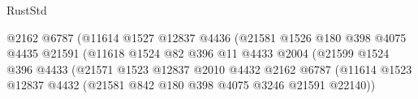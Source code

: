 \begin{lexlean}{RustStd}
\begin{coremodule}
                                                @2162
                                                @6787
                                                (@11614
                                                  @1527
                                                  @12837
                                                  @4436
                                                  (@21581
                                                    @1526
                                                    @180
                                                    @398
                                                    @4075
                                                    @4435
                                                    @21591
                                                    (@11618
                                                      @1524
                                                      @82
                                                      @396
                                                      @11
                                                      @4433
                                                      @2004
                                                      (@21599
                                                        @1524
                                                        @396
                                                        @4433
                                                        (@21571
                                                          @1523
                                                          @12837
                                                          @2010
                                                          @4432
                                                          @2162
                                                          @6787
                                                          (@11614
                                                            @1523
                                                            @12837
                                                            @4432
                                                            (@21581
                                                              @842
                                                              @180
                                                              @398
                                                              @4075
                                                              @3246
                                                              @21591
                                                              @22140))

\end{coremodule}
\end{lexlean}

